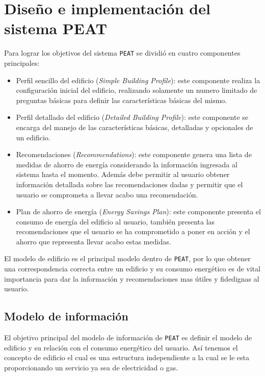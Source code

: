 \chapter{Diseño e implementación del sistema PEAT}

Para lograr los objetivos del sistema \texttt{PEAT} se dividió en cuatro
componentes principales:

\begin{itemize}
\item Perfil sencillo del edificio (\textit{Simple Building Profile}): este
  componente realiza la configuración inicial del edificio, realizando solamente
  un numero limitado de preguntas básicas para definir las características básicas
  del mismo.
\item Perfil detallado del edificio (\textit{Detailed Building Profile}):
  este componente se encarga del manejo de las características básicas, detalladas y
  opcionales de un edificio.
\item Recomendaciones (\textit{Recommendations}): este componente genera una lista
  de medidas de ahorro de energía considerando la información ingresada al sistema
  hasta el momento. Además debe permitir al usuario obtener información detallada
  sobre las recomendaciones dadas y permitir que el usuario se comprometa a
  llevar acabo una recomendación.
\item Plan de ahorro de energía (\textit{Energy Savings Plan}): este componente
  presenta el consumo de energía del edificio al usuario, también presenta las
  recomendaciones que el usuario se ha comprometido a poner en acción y el
  ahorro que representa llevar acabo estas medidas.
\end{itemize}

El  modelo de edificio es el principal modelo dentro de \texttt{PEAT}, por lo que
obtener una correspondencia correcta entre un edificio y su consumo energético
es de vital importancia para dar la información y recomendaciones mas útiles y
fidedignas al usuario.

\section{Modelo de información}

El objetivo principal del modelo de información de \texttt{PEAT} es definir el
modelo de edificio y su relación con el consumo energético del usuario. Así
tenemos el concepto de edificio el cual es una estructura independiente a la
cual se le esta proporcionando un servicio ya sea de electricidad o gas.

